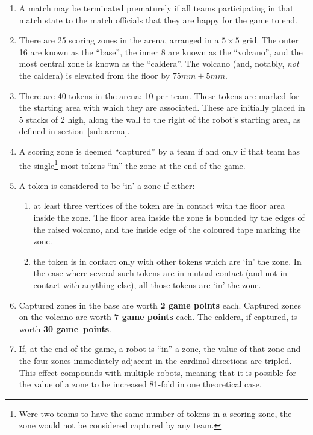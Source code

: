 \begin{enumerate}
\item A match may be terminated prematurely if all teams participating in that match state to the match officials that they are happy for the game to end.

\item There are 25 scoring zones in the arena, arranged in a $5\times5$ grid. The outer 16 are known as the ``base'', the inner 8 are known as the ``volcano'', and the most central zone is known as the ``caldera''. The volcano (and, notably, \emph{not} the caldera) is elevated from the floor by $75 mm \pm 5 mm$.

\item There are 40 tokens in the arena: 10 per team. These tokens are marked for the starting area with which they are associated. These are initially placed in 5 stacks of 2 high, along the wall to the right of the robot's starting area, as defined in section~\ref{sub:arena}.

\item A scoring zone is deemed ``captured'' by a team if and only if that team has the single\footnote{Were two teams to have the same number of tokens in a scoring zone, the zone would not be considered captured by any team.} most tokens ``in'' the zone at the end of the game.

\item A token is considered to be `in' a zone if either:
\begin{enumerate}
  \item at least three vertices of the token are in contact with the floor area inside the zone. The floor area inside the zone is bounded by the edges of the raised volcano, and the inside edge of the coloured tape marking the zone.
  \item the token is in contact only with other tokens which are `in' the zone. In the case where several such tokens are in mutual contact (and not in contact with anything else), all those tokens are `in' the zone.
\end{enumerate}

\item Captured zones in the base are worth \textbf{2 game points} each. Captured zones on the volcano are worth \textbf{7 game points} each. The caldera, if captured, is worth \textbf{30 game~points}.

\item If, at the end of the game, a robot is ``in'' a zone, the value of that zone and the four zones immediately adjacent in the cardinal directions are tripled. This effect compounds with multiple robots, meaning that it is possible for the value of a zone to be increased 81-fold in one theoretical case.  %


\end{enumerate}
